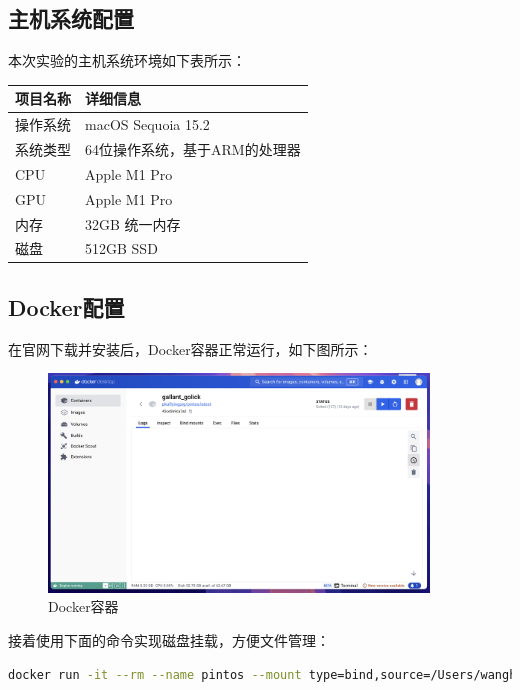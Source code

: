 \documentclass{article}
\begin{document}
\subsection{主机系统配置}

本次实验的主机系统环境如下表所示：

\begin{center}
	\begin{tabular}{| >{\centering\arraybackslash}m{3cm} | >{\centering\arraybackslash}m{7cm} |}    
		\hline  
		\textbf{项目名称} & \textbf{详细信息} \\
		\hline  
		操作系统 & macOS Sequoia 15.2 \\  
		\hline  
		系统类型 & 64位操作系统，基于ARM的处理器 \\  
		\hline
		CPU & Apple M1 Pro \\  
		\hline 
		GPU & Apple M1 Pro\\  
		\hline 
		内存 & 32GB 统一内存 \\  
		\hline 
		磁盘 & 512GB SSD \\  
		\hline 		
	\end{tabular}
\end{center}

\subsection{Docker配置}

在官网下载并安装后，Docker容器正常运行，如下图所示：

\begin{figure}[H]
	\centering
	\includegraphics[width=0.9\textwidth]{img/docker_install.png}
	\caption{Docker容器}
\end{figure}

接着使用下面的命令实现磁盘挂载，方便文件管理：

\begin{lstlisting}[language=Bash, title=启动Docker容器并挂载文件]
	docker run -it --rm --name pintos --mount type=bind,source=/Users/wanghaisheng/Desktop/Coding/Courses/ECNU-Operating-System-WHS/pintos,target=/home/PKUOS/pintos pkuflyingpig/pintos bash
\end{lstlisting}
\end{document}
